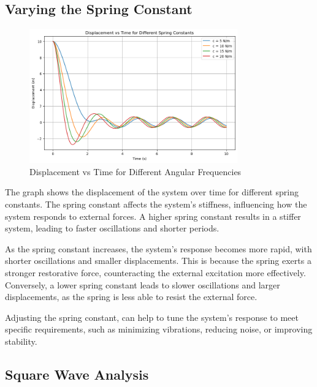 \documentclass[12pt,a4paper]{article}
\begin{document}
\subsection{Varying the Spring Constant}
\begin{figure}[H]
    \centering
    \includegraphics[width=0.8\textwidth]{spring_constant_effect_on_system.png} 
    \caption{Displacement vs Time for Different Angular Frequencies}
    \label{fig:system}
\end{figure}
{\vspace{10pt}}


The graph shows the displacement of the system over time for different spring constants. The spring constant affects the system's stiffness, influencing how the system responds to external forces. A higher spring constant results in a stiffer system, leading to faster oscillations and shorter periods.

As the spring constant increases, the system's response becomes more rapid, with shorter oscillations and smaller displacements. This is because the spring exerts a stronger restorative force, counteracting the external excitation more effectively. Conversely, a lower spring constant leads to slower oscillations and larger displacements, as the spring is less able to resist the external force.

Adjusting the spring constant, can help to tune the system's response to meet specific requirements, such as minimizing vibrations, reducing noise, or improving stability.

{\vspace{10pt}}


\subsection{Square Wave Analysis}
\end{document}
